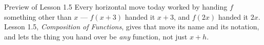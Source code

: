 \documentclass[10pt]{article}
\begin{document}
\vspace{0.1in}

\boxguard[9]
\begin{notesbox}{Preview of Lesson 1.5}
Every horizontal move today worked by handing $f$ something other than $x$ ---
$f(x+3)$ handed it $x+3$, and $f(2x)$ handed it $2x$. Lesson 1.5,
\textit{Composition of Functions}, gives that move its name and its notation,
and lets the thing you hand over be \textit{any} function, not just $x + h$.
\end{notesbox}
\end{document}
